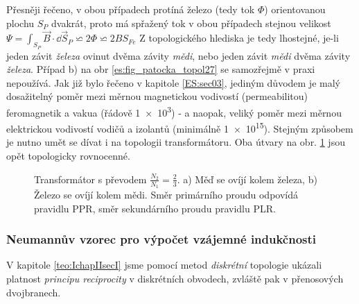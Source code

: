         Přesněji řečeno, v obou případech protíná železo (tedy tok \(\Phi\)) orientovanou plochu 
        \(S_P\) dvakrát, proto má spřažený tok v obou případech stejnou velikost \(\Psi = 
        \int_{S_P}\vec{B}\cdot \dd{\vec{S}}_P \backsimeq 2\Phi \backsimeq 2BS_{Fe}\) Z topologického 
        hlediska je tedy lhostejné, je-li jeden závit \emph{železa} ovinut dvěma závity 
        \emph{mědi}, nebo jeden závit \emph{mědi} dvěma závity \emph{železa}. Případ b) na obr 
        \ref{es:fig_patocka_topol27} se samozřejmě v praxi nepoužívá. Jak již bylo řečeno v 
        kapitole \ref{ES:sec03}, jediným důvodem je malý dosažitelný poměr mezi měrnou magnetickou 
        vodivostí (permeabilitou) feromagnetik a vakua (řádově \num{1e3}) - a naopak, veliký poměr 
        mezi měrnou elektrickou vodivostí vodičů a izolantů (minimálně \num{1e15}). Stejným 
        způsobem je nutno umět se dívat i na topologii transformátoru. Oba útvary na 
        obr. \ref{es:fig_patocka_topol28} jsou opět topologicky rovnocenné.
        \begin{figure}[ht!]
          \centering  
          \caption{Transformátor s převodem \(\frac{N_2}{N_1} = \frac{2}{3}\). a) Měď se ovíjí 
                   kolem železa, b) Železo se  ovíjí kolem mědi. Směr primárního proudu odpovídá 
                   pravidlu PPR, směr sekundárního proudu pravidlu PLR.
                   \cite[s.~61]{Patocka4}} 
          \label{es:fig_patocka_topol28}
        \end{figure} 
        
      \subsubsection{Neumannův vzorec pro výpočet vzájemné indukčnosti}
        V kapitole \ref{teo:IchapIIsecI} jsme pomocí metod \emph{diskrétní} topologie ukázali 
        platnost \emph{principu reciprocity} v diskrétních obvodech, zvláště pak v přenosových 
        dvojbranech.
        
